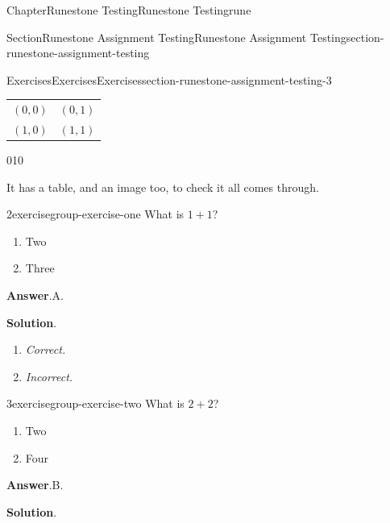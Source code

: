 \documentclass[oneside,10pt,]{book}
\newcommand{\blocktitlefont}{\relax}
\newcommand{\tabularfont}{\relax}
\newcommand{\lititle}[1]{{\slshape#1}}
\numberwithin{equation}{section}
\begin{document}
\begin{chapterptx}{Chapter}{Runestone Testing}{}{Runestone Testing}{}{}{rune}
\begin{sectionptx}{Section}{Runestone Assignment Testing}{}{Runestone Assignment Testing}{}{}{section-runestone-assignment-testing}
\begin{exercises-subsection-numberless}{Exercises}{Exercises}{}{Exercises}{}{}{section-runestone-assignment-testing-3}
\begin{center}
{\tabularfont%
\begin{tabular}{ll}
\((0,0)\)&\((0,1)\)\tabularnewline[0pt]
\((1,0)\)&\((1,1)\)
\end{tabular}
}%
\end{center}%
\begin{image}{0}{1}{0}{}%
%
\end{image}%
It has a table, and an image too, to check it all comes through.%
\begin{exercisegroup}
\begin{divisionexerciseeg}{2}{}{}{exercisegroup-exercise-one}%
What is \(1+1\)?%
\par
%
\begin{enumerate}[label={\Alph*.}]
\item{}Two%
\item{}Three%
\end{enumerate}
%
\par\smallskip%
\noindent\textbf{\blocktitlefont Answer}.\hypertarget{exercisegroup-exercise-one-2}{}\quad{}A.%
\par\smallskip%
\noindent\textbf{\blocktitlefont Solution}.\hypertarget{exercisegroup-exercise-one-3}{}\quad{}%
\begin{enumerate}[label={\Alph*.}]
\item{}\lititle{Correct.}\par%
%
\item{}\lititle{Incorrect.}\par%
%
\end{enumerate}
%
\end{divisionexerciseeg}%
\begin{divisionexerciseeg}{3}{}{}{exercisegroup-exercise-two}%
What is \(2+2\)?%
\par
%
\begin{enumerate}[label={\Alph*.}]
\item{}Two%
\item{}Four%
\end{enumerate}
%
\par\smallskip%
\noindent\textbf{\blocktitlefont Answer}.\hypertarget{exercisegroup-exercise-two-2}{}\quad{}B.%
\par\smallskip%
\noindent\textbf{\blocktitlefont Solution}.\hypertarget{exercisegroup-exercise-two-3}{}\quad{}%
\begin{enumerate}[label={\Alph*.}]

\end{enumerate}
\end{divisionexerciseeg}
\end{exercisegroup}
\end{exercises-subsection-numberless}
\end{sectionptx}
\end{chapterptx}
\end{document}
